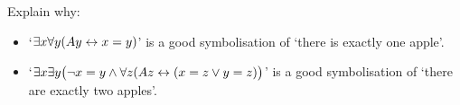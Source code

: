 


\problempart Explain why:
	\begin{itemize}
		\item   `$\exists x \forall y(Ay \leftrightarrow x= y)$' is a good symbolisation of `there is exactly one apple'.
		\item `$\exists x \exists y \bigl(\neg x = y \wedge \forall z(Az \leftrightarrow (x= z \vee y = z) \bigr)$' is a good symbolisation of `there are exactly two apples'.
	\end{itemize}		

